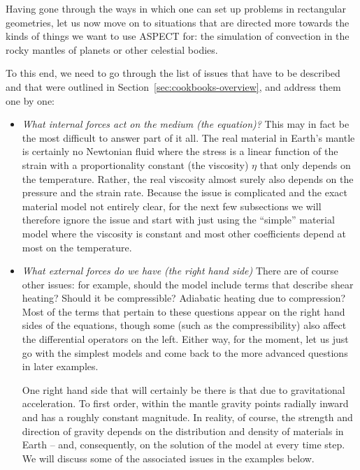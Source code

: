 \documentclass{article}
\newcommand{\aspect}{\textsc{ASPECT}}
\begin{document}
Having gone through the ways in which one can set up problems in rectangular
geometries, let us now move on to situations that are directed more towards the
kinds of things we want to use \aspect{} for: the simulation of convection in
the rocky mantles of planets or other celestial bodies.

To this end, we need to go through the list of issues that have to be described
and that were outlined in Section~\ref{sec:cookbooks-overview}, and address them
one by one:
\begin{itemize}
  \item \textit{What internal forces act on the medium (the equation)?}
    This may in fact be the most difficult to answer part of it all. The real
    material in Earth's mantle is certainly no Newtonian fluid where the stress
    is a linear function of the strain with a proportionality constant (the
    viscosity) $\eta$ that only depends on the temperature. Rather, the
    real viscosity almost surely also depends on the pressure and the strain
    rate. Because the issue is complicated and the exact material model not
    entirely clear, for the next few subsections we will therefore ignore the
    issue and start with just using the ``simple'' material model where the
    viscosity is constant and most other coefficients depend at most on the
    temperature.

  \item \textit{What external forces do we have (the right hand side)}
    There are of course other issues: for example, should the model include terms
    that describe shear heating? Should it be compressible? Adiabatic heating due
    to compression? Most of the terms that pertain to these questions appear on
    the right hand sides of the equations, though some (such as the
    compressibility) also affect the differential operators on the left. Either
    way, for the moment, let us just go with the simplest models and come back to
    the more advanced questions in later examples.

    One right hand side that will certainly be there is that due to gravitational
    acceleration. To first order, within the mantle gravity points radially
    inward and has a roughly constant magnitude. In reality, of course, the
    strength and direction of gravity depends on the distribution and density of
    materials in Earth -- and, consequently, on the solution of the model at
    every time step. We will discuss some of the associated issues in the
    examples below.


\end{itemize}
\end{document}

